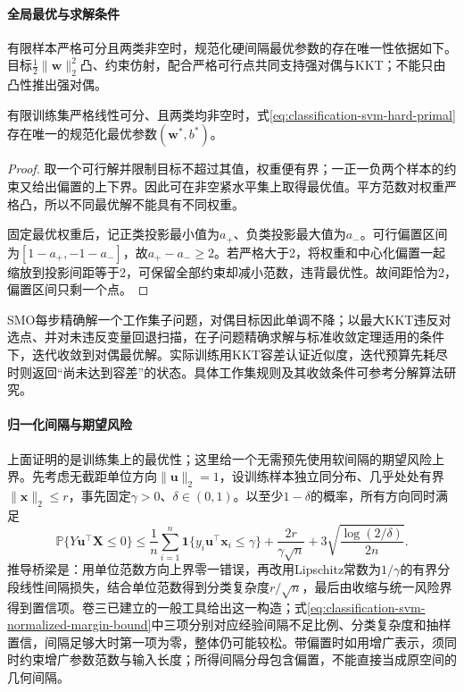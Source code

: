 \paragraph{全局最优与求解条件}
有限样本严格可分且两类非空时，规范化硬间隔最优参数的存在唯一性依据如下。目标$\tfrac12\lVert\bm{w}\rVert_2^2$凸、约束仿射，配合严格可行点共同支持强对偶与KKT；不能只由凸性推出强对偶。

\begin{theorem}[可分硬间隔问题的最优解]
  \label{thm:classification-svm-hard-unique}
  有限训练集严格线性可分、且两类均非空时，式\eqref{eq:classification-svm-hard-primal}存在唯一的规范化最优参数$(\bm w^\ast,b^\ast)$。
\end{theorem}
\begin{proof}
取一个可行解并限制目标不超过其值，权重便有界；一正一负两个样本的约束又给出偏置的上下界。因此可在非空紧水平集上取得最优值。平方范数对权重严格凸，所以不同最优解不能具有不同权重。

固定最优权重后，记正类投影最小值为$a_+$、负类投影最大值为$a_-$。可行偏置区间为$[1-a_+,-1-a_-]$，故$a_+-a_-\geq2$。若严格大于2，将权重和中心化偏置一起缩放到投影间距等于2，可保留全部约束却减小范数，违背最优性。故间距恰为2，偏置区间只剩一个点。
\end{proof}

SMO每步精确解一个工作集子问题，对偶目标因此单调不降；以最大KKT违反对选点、并对未违反变量回退扫描，在子问题精确求解与标准收敛定理适用的条件下，迭代收敛到对偶最优解。实际训练用KKT容差认证近似度，迭代预算先耗尽时则返回“尚未达到容差”的状态。具体工作集规则及其收敛条件可参考分解算法研究。

\paragraph{归一化间隔与期望风险}
上面证明的是训练集上的最优性；这里给一个无需预先使用软间隔的期望风险上界。先考虑无截距单位方向$\lVert\bm{u}\rVert_2=1$，设训练样本独立同分布、几乎处处有界$\lVert\bm{x}\rVert_2\le r$，事先固定$\gamma>0$、$\delta\in(0,1)$。以至少$1-\delta$的概率，所有方向同时满足
\begin{equation}
  \mathbb P\{Y\bm{u}^{\top}\bm{X}\le0\}
  \le\frac1n\sum_{i=1}^n\mathbf 1\{y_i\bm{u}^{\top}\bm{x}_i\le\gamma\}
    +\frac{2r}{\gamma\sqrt n}
    +3\sqrt{\frac{\log(2/\delta)}{2n}}.
  \label{eq:classification-svm-normalized-margin-bound}
\end{equation}
推导桥梁是：用单位范数方向上界零一错误，再改用Lipschitz常数为$1/\gamma$的有界分段线性间隔损失，结合单位范数得到分类复杂度$r/\sqrt n$，最后由收缩与统一风险界得到置信项。卷三已建立的一般工具给出这一构造；式\eqref{eq:classification-svm-normalized-margin-bound}中三项分别对应经验间隔不足比例、分类复杂度和抽样置信，间隔足够大时第一项为零，整体仍可能较松。带偏置时如用增广表示，须同时约束增广参数范数与输入长度；所得间隔分母包含偏置，不能直接当成原空间的几何间隔。


